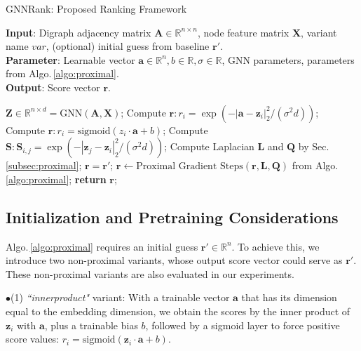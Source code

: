 \documentclass[nohyperref]{article}
\theoremstyle{plain}
\theoremstyle{definition}
\theoremstyle{remark}
\newcommand{\bb}{\hspace{-1mm} $\bullet$}
\begin{document}
\begin{algorithm}[tb!]
\begin{small}
\caption{GNNRank: Proposed Ranking Framework}
\label{alg:algorithm}
\textbf{Input}: Digraph adjacency matrix $\mathbf{A}\in\mathbb{R}^{n\times n}$, node feature matrix $\mathbf{X}$, variant name $var$, (optional) initial guess from baseline $\mathbf{r'}$.\\
\textbf{Parameter}: Learnable vector $\mathbf{a}\in\mathbb{R}^n, b\in\mathbb{R}, \sigma\in\mathbb{R}$, GNN parameters, parameters from Algo.\,\ref{algo:proximal}.\\
\textbf{Output}: Score vector $\mathbf{r}$.
\begin{algorithmic}[1] 
\STATE $\mathbf{Z}\in\mathbb{R}^{n\times d} = \text{GNN}(\mathbf{A},\mathbf{X})$;
\STATE Compute $\mathbf{r}: r_i = \exp(-|\mathbf{a}-\mathbf{z}_i|_2^2/(\sigma^2d))$;
\STATE Compute $\mathbf{r}: r_i = \text{sigmoid}(z_i\cdot \mathbf{a}+b)$;
\ENDIF
{}
\STATE Compute $\mathbf{S}:\mathbf{S}_{i,j}=\exp(-|\mathbf{z}_j-\mathbf{z}_i|_2^2/(\sigma^2d))$;
\STATE Compute Laplacian $\mathbf{L}$ and $\mathbf{Q}$ by Sec. \ref{subsec:proximal};
    \STATE $\mathbf{r} =\mathbf{r'}$;
    \ENDIF
    \STATE $\mathbf{r}\leftarrow \text{Proximal Gradient Steps} (\mathbf{r}, \mathbf{L}, \mathbf{Q})$ from Algo.\,\ref{algo:proximal};
\ENDIF
\STATE \textbf{return} $\mathbf{r}$;
\end{algorithmic}
\label{algo:framework}
\end{small}
\end{algorithm}

\subsection{Initialization and Pretraining Considerations}
Algo.\,\ref{algo:proximal} requires an initial guess $\mathbf{r'}\in\mathbb{R}^n$.
To achieve this, we introduce two non-proximal variants, whose output score vector could serve as $\mathbf{r'}$. These non-proximal variants are also evaluated in our experiments.

\bb (1) \emph{``innerproduct"} variant: With a trainable vector $\mathbf{a}$ that has its dimension equal to the embedding dimension, we obtain the scores by the inner product of $\mathbf{z}_i$  with  $\mathbf{a}$, plus a trainable  bias $b$, followed by a sigmoid layer to force positive score values: $r_i = \text{sigmoid}(\mathbf{z}_i \cdot \mathbf{a} + b).$ 
    
\end{document}

